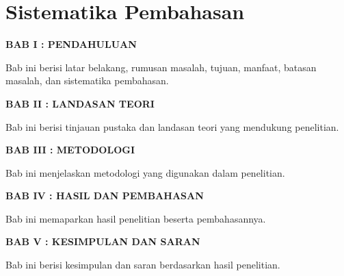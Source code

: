 
\section{Sistematika Pembahasan}

\noindent
\textbf{BAB I : PENDAHULUAN}

Bab ini berisi latar belakang, rumusan masalah, tujuan, manfaat,
batasan masalah, dan sistematika pembahasan.

\noindent
\textbf{BAB II : LANDASAN TEORI}

Bab ini berisi tinjauan pustaka dan landasan teori yang mendukung
penelitian.

\noindent
\textbf{BAB III : METODOLOGI}

Bab ini menjelaskan metodologi yang digunakan dalam penelitian.

\noindent
\textbf{BAB IV : HASIL DAN PEMBAHASAN}

Bab ini memaparkan hasil penelitian beserta pembahasannya.

\noindent
\textbf{BAB V : KESIMPULAN DAN SARAN}

Bab ini berisi kesimpulan dan saran berdasarkan hasil penelitian.
